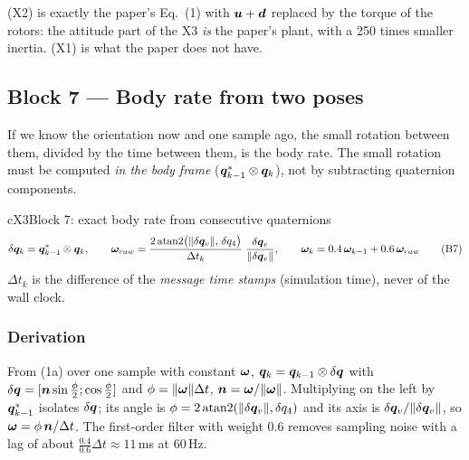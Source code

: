 (X2) is exactly the paper's Eq.~(1) with $\bm{u}+\bm{d}$ replaced by the torque of the rotors: the attitude part of the X3
\emph{is} the paper's plant, with a 250 times smaller inertia. (X1) is what the paper does not have.

\subsection{Block 7 --- Body rate from two poses}
\label{sec:b7}

\begin{idea}
If we know the orientation now and one sample ago, the small rotation between them, divided by the time between
them, is the body rate. The small rotation must be computed \emph{in the body frame} ($\bm{q}_{k-1}^*\otimes\bm{q}_k$), not by
subtracting quaternion components.
\end{idea}

\begin{eqbox}{cX3}{Block 7: exact body rate from consecutive quaternions}
\begin{equation}
\delta\bm{q}_k=\bm{q}_{k-1}^{*}\otimes\bm{q}_k,\qquad
\bm{\omega}_{raw}=\frac{2\,\mathrm{atan2}\big(\|\delta\bm{q}_v\|,\,\delta q_4\big)}{\Delta t_k}\;\frac{\delta\bm{q}_v}{\|\delta\bm{q}_v\|},\qquad
\bm{\omega}_k=0.4\,\bm{\omega}_{k-1}+0.6\,\bm{\omega}_{raw} \tag{B7}\label{eq:b7}
\end{equation}
$\Delta t_k$ is the difference of the \emph{message time stamps} (simulation time), never of the wall clock.
\end{eqbox}

\subsubsection*{Derivation}
From (1a) over one sample with constant $\bm{\omega}$, $\bm{q}_k=\bm{q}_{k-1}\otimes\delta\bm{q}$ with
$\delta\bm{q}=[\bm n\sin\tfrac{\phi}{2};\cos\tfrac{\phi}{2}]$ and $\phi=\|\bm{\omega}\|\Delta t$, $\bm n=\bm{\omega}/\|\bm{\omega}\|$. Multiplying on the left by
$\bm{q}_{k-1}^*$ isolates $\delta\bm{q}$; its angle is $\phi=2\,\mathrm{atan2}(\|\delta\bm{q}_v\|,\delta q_4)$ and its axis is
$\delta\bm{q}_v/\|\delta\bm{q}_v\|$, so $\bm{\omega}=\phi\,\bm n/\Delta t$. The first-order filter with weight 0.6 removes sampling noise
with a lag of about $\tfrac{0.4}{0.6}\Delta t\approx11$\,ms at 60\,Hz.


